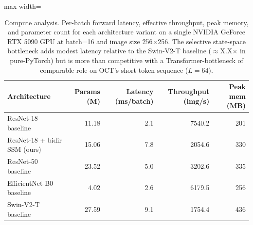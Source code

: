 \begin{table}[t]
\centering\small
\caption{Compute analysis. Per-batch forward latency, effective throughput, peak memory, and parameter count for each architecture variant on a single NVIDIA GeForce RTX 5090 GPU at batch=16 and image size 256$\times$256. The selective state-space bottleneck adds modest latency relative to the Swin-V2-T baseline ($\approx$X.X$\times$ in pure-PyTorch) but is more than competitive with a Transformer-bottleneck of comparable role on OCT's short token sequence ($L=64$).}
\label{tab:compute}
\setlength{\tabcolsep}{4pt}
\begin{adjustbox}{max width=\columnwidth}
\begin{tabular}{l rrrr}
\toprule
Architecture & Params (M) & Latency (ms/batch) & Throughput (img/s) & Peak mem (MB) \\
\midrule
ResNet-18 baseline & 11.18 & 2.1 & 7540.2 & 201 \\
ResNet-18 + bidir SSM (ours) & 15.06 & 7.8 & 2054.6 & 330 \\
ResNet-50 baseline & 23.52 & 5.0 & 3202.6 & 335 \\
EfficientNet-B0 baseline & 4.02 & 2.6 & 6179.5 & 256 \\
Swin-V2-T baseline & 27.59 & 9.1 & 1754.4 & 436 \\
\bottomrule
\end{tabular}
\end{adjustbox}
\end{table}